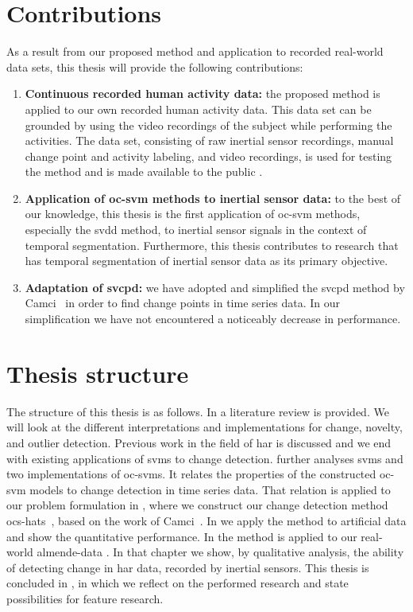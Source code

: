 \section{Contributions}\label{sec:intro_contributions}
As a result from our proposed method and application to recorded real-world data sets, this thesis will provide the following contributions:
\begin{enumerate}
  \item \textbf{Continuous recorded human activity data:} the proposed method is applied to our own recorded human activity data.
  This data set can be grounded by using the video recordings of the subject while performing the activities.
  The data set, consisting of raw inertial sensor recordings, manual change point and activity labeling, and video recordings, is used for testing the method and is made available to the public \cite{vlasveld2014acras}.
  \item \textbf{Application of \gls{oc-svm} methods to inertial sensor data:} to the best of our knowledge, this thesis is the first application of \gls{oc-svm} methods, especially the \gls{svdd} method, to inertial sensor signals in the context of temporal segmentation.
  Furthermore, this thesis contributes to research that has temporal segmentation of inertial sensor data as its primary objective.
  \item \textbf{Adaptation of \acrshort{svcpd}:} we have adopted and simplified the \acrshort{svcpd} method by Camci~\cite{camci2010change} in order to find change points in time series data.
  In our simplification we have not encountered a noticeably decrease in performance.
\end{enumerate}

\section{Thesis structure}\label{sec:intro_thesis_structure}
The structure of this thesis is as follows.
In  a literature review is provided.
We will look at the different interpretations and implementations for change, novelty, and outlier detection.
Previous work in the field of \gls{har} is discussed and we end with existing applications of \glspl{svm} to change detection.
 further analyses \glspl{svm} and two implementations of \glspl{oc-svm}.
It relates the properties of the constructed \gls{oc-svm} models to change detection in time series data.
That relation is applied to our problem formulation in , where we construct our change detection method \gls{ocs-hats}~\cite{vlasveld2014hats}, based on the work of Camci~\cite{camci2010change}.
In  we apply the method to artificial data and show the quantitative performance.
In  the method is applied to our real-world \gls{almende-data} \cite{vlasveld2014acras}.
In that chapter we show, by qualitative analysis, the ability of detecting change in \gls{har} data, recorded by inertial sensors.
This thesis is concluded in , in which we reflect on the performed research and state possibilities for feature research.